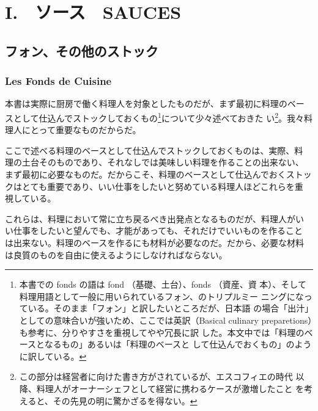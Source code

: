 \hypertarget{i.ux30bdux30fcux30b9sauces}{%
\chapter{I.　ソース　SAUCES}\label{i.ux30bdux30fcux30b9sauces}}

\hypertarget{ux30d5ux30a9ux30f3ux305dux306eux4ed6ux306eux30b9ux30c8ux30c3ux30af}{%
\section{フォン、その他のストック}\label{ux30d5ux30a9ux30f3ux305dux306eux4ed6ux306eux30b9ux30c8ux30c3ux30af}}

\hypertarget{les-fonds-de-cuisine}{%
\subsection{Les Fonds de Cuisine}\label{les-fonds-de-cuisine}}

 

本書は実際に厨房で働く料理人を対象としたものだが、まず最初に料理のベー
スとして仕込んでストックしておくもの\footnote{本書での fonds の語は fond
  （基礎、土台）、fonds （資産、資
  本）、そして料理用語として一般に用いられているフォン、のトリプルミー
  ニングになっている。そのまま「フォン」と訳したいところだが、日本語
  の場合「出汁」としての意味合いが強いため、ここでは英訳（Basical
  culinary preparetions）も参考に、分りやすさを重視してやや冗長に訳
  した。本文中では「料理のベースとなるもの」あるいは「料理のベースと
  して仕込んでおくもの」のように訳している。}について少々述べておきた
い\footnote{この部分は経営者に向けた書き方がされているが、エスコフィエの時代
  以降、料理人がオーナーシェフとして経営に携わるケースが激増したこと
  を考えると、その先見の明に驚かざるを得ない。}。我々料理人にとって重要なものだからだ。

ここで述べる料理のベースとして仕込んでストックしておくものは、実際、料
理の土台そのものであり、それなしでは美味しい料理を作ることの出来ない、
まず最初に必要なものだ。だからこそ、料理のベースとして仕込んでおくストッ
クはとても重要であり、いい仕事をしたいと努めている料理人ほどこれらを重
視している。

これらは、料理において常に立ち戻るべき出発点となるものだが、料理人がい
い仕事をしたいと望んでも、才能があっても、それだけでいいものを作ること
は出来ない。料理のベースを作るにも材料が必要なのだ。だから、必要な材料
は良質のものを自由に使えるようにしなければならない。

